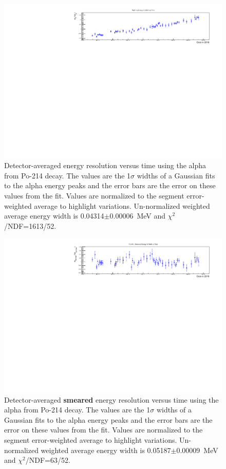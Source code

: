\clearpage
\newpage
\begin{figure}[!h]
\centering
\includegraphics[width=1.05\textwidth]{figures/PubBiPo214EresvsT.pdf}
\caption{\label{fig:EresvsT214}Detector-averaged energy resolution versus time using the alpha from Po-214 decay. The values are the 1$\sigma$ widths of a Gaussian fits to the alpha energy peaks and the error bars are the error on these values from the fit. Values are normalized to the segment error-weighted average to highlight variations. Un-normalized weighted average energy width is 0.04314$\pm$0.00006~MeV and $\chi^2$/NDF=1613/52.}
\end{figure}
\begin{figure}[!h]
\centering
\includegraphics[width=1.05\textwidth]{figures/PubBiPo214EsmearresvsT.pdf}
\caption{\label{fig:EsmearresvsT214}Detector-averaged {\bf smeared} energy resolution versus time using the alpha from Po-214 decay. The values are the 1$\sigma$ widths of a Gaussian fits to the alpha energy peaks and the error bars are the error on these values from the fit. Values are normalized to the segment error-weighted average to highlight variations. Un-normalized weighted average energy width is 0.05187$\pm$0.00009~MeV and $\chi^2$/NDF=63/52.}
\end{figure}
\clearpage
\newpage
